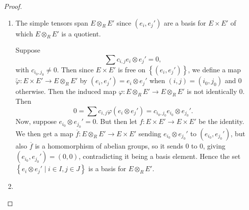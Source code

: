 \documentclass[reqno]{amsart}
\theoremstyle{definition}
\theoremstyle{remark}
\begin{document}
    \begin{proof}
        \begin{enumerate}
            \item 
                The simple tensors
                span $E \otimes_R E'$ since 
                $\left( e_i, e_j' \right) $ are
                a basis for $E \times E'$ of which
                $E \otimes_R E'$ is a quotient.

                Suppose
                 \[
                \sum c_{i,j} e_i \otimes e_j' = 0,
                \] 
                with $c_{i_0,j_0}\neq 0$. Then
                since $E \times E'$ is free
                on $\left\{ \left( e_i, e_{j}' \right)  \right\} $,
                we define a map
                $\tilde{\varphi } 
                \colon E \times E' \to 
                E \otimes_R E'$ by
                $\left( e_i, e_j' \right) =
                e_i \otimes e_j'$ when
                $\left( i,j \right) = \left( i_0,j_0 \right) $ 
                and $0$ otherwise. Then
                the induced map
                 $\varphi \colon E \otimes_R E' \to E \otimes_R E'$ is not
                 identically $0$. Then
                 \[
                      0 = \sum c_{i,j} \varphi \left( e_i
                      \otimes e_j' \right) 
                      = c_{i_0,j_0} e_{i_0} \otimes
                      e_{j_0}'.
                 \] 
                 Now, suppose
                 $e_{i_0} \otimes
                 e_{j_0}' = 0$. But
                 then let 
                 $f \colon E \times E' \to E \times E'$ 
                 be the identity.
                 We then get a map
                 $\overline{f} \colon
                 E \otimes_R E' \to 
                 E \times E'$ sending
                 $e_{i_0} \otimes e_{j_0}'$ to
                 $\left( e_{i_0},e_{j_0}' \right) $, but
                 also
                 $\overline{f}$ is a homomorphism of
                 abelian groups, so it sends
                 $0$ to $0$, giving
                 $\left( e_{i_0}, e_{j_0}' \right) = \left( 0,0
                 \right) $, contradicting it being
                 a basis element. Hence
                 the set
                 $\left\{ e_i \otimes e_{j}'  \mid 
                 i \in I, j \in J\right\} $ is a basis
                 for $E \otimes_R E'$.
             \item 


\end{enumerate}
\end{proof}
\end{document}
